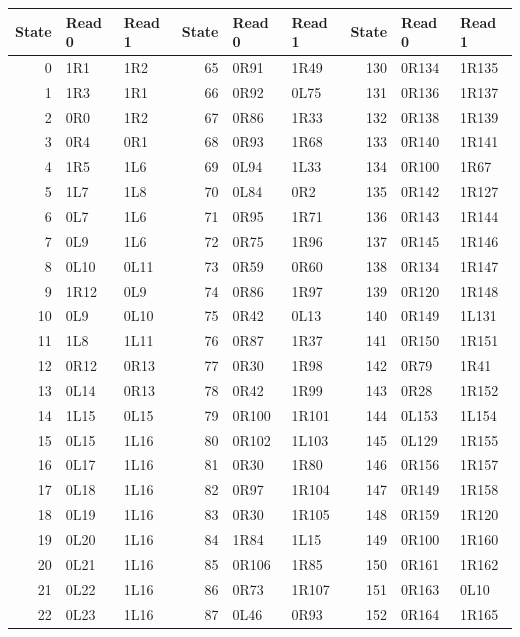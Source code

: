{\small\ttfamily
\begin{longtable}{@{}rll@{\hspace{1.4em}}rll@{\hspace{1.4em}}rll@{}}
\toprule State & Read 0 & Read 1 & State & Read 0 & Read 1 & State & Read 0 & Read 1\\\midrule\endhead
0 & 1R1 & 1R2 & 65 & 0R91 & 1R49 & 130 & 0R134 & 1R135\\
1 & 1R3 & 1R1 & 66 & 0R92 & 0L75 & 131 & 0R136 & 1R137\\
2 & 0R0 & 1R2 & 67 & 0R86 & 1R33 & 132 & 0R138 & 1R139\\
3 & 0R4 & 0R1 & 68 & 0R93 & 1R68 & 133 & 0R140 & 1R141\\
4 & 1R5 & 1L6 & 69 & 0L94 & 1L33 & 134 & 0R100 & 1R67\\
5 & 1L7 & 1L8 & 70 & 0L84 & 0R2 & 135 & 0R142 & 1R127\\
6 & 0L7 & 1L6 & 71 & 0R95 & 1R71 & 136 & 0R143 & 1R144\\
7 & 0L9 & 1L6 & 72 & 0R75 & 1R96 & 137 & 0R145 & 1R146\\
8 & 0L10 & 0L11 & 73 & 0R59 & 0R60 & 138 & 0R134 & 1R147\\
9 & 1R12 & 0L9 & 74 & 0R86 & 1R97 & 139 & 0R120 & 1R148\\
10 & 0L9 & 0L10 & 75 & 0R42 & 0L13 & 140 & 0R149 & 1L131\\
11 & 1L8 & 1L11 & 76 & 0R87 & 1R37 & 141 & 0R150 & 1R151\\
12 & 0R12 & 0R13 & 77 & 0R30 & 1R98 & 142 & 0R79 & 1R41\\
13 & 0L14 & 0R13 & 78 & 0R42 & 1R99 & 143 & 0R28 & 1R152\\
14 & 1L15 & 0L15 & 79 & 0R100 & 1R101 & 144 & 0L153 & 1L154\\
15 & 0L15 & 1L16 & 80 & 0R102 & 1L103 & 145 & 0L129 & 1R155\\
16 & 0L17 & 1L16 & 81 & 0R30 & 1R80 & 146 & 0R156 & 1R157\\
17 & 0L18 & 1L16 & 82 & 0R97 & 1R104 & 147 & 0R149 & 1R158\\
18 & 0L19 & 1L16 & 83 & 0R30 & 1R105 & 148 & 0R159 & 1R120\\
19 & 0L20 & 1L16 & 84 & 1R84 & 1L15 & 149 & 0R100 & 1R160\\
20 & 0L21 & 1L16 & 85 & 0R106 & 1R85 & 150 & 0R161 & 1R162\\
21 & 0L22 & 1L16 & 86 & 0R73 & 1R107 & 151 & 0R163 & 0L10\\
22 & 0L23 & 1L16 & 87 & 0L46 & 0R93 & 152 & 0R164 & 1R165\\

\end{longtable}}
